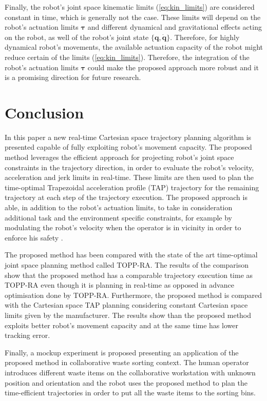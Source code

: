 Finally, the robot's joint space kinematic limits (\ref{eq:kin_limits}) are considered constant in time, which is generally not the case.
These limits will depend on the robot's actuation limits $\bm{\tau}$ and different dynamical and gravitational effects acting on the robot, as well of the robot's joint state $\{\bm{q},\dot{\bm{q}}\}$. Therefore, for highly dynamical robot's movements, the available actuation capacity of the robot might reduce certain of the limits (\ref{eq:kin_limits}). Therefore, the integration of the robot's actuation limits $\bm{\tau}$ could make the proposed approach more robust and it is a promising direction for future research. 


\section{Conclusion}


In this paper a new real-time Cartesian space trajectory planning algorithm is presented capable of fully exploiting robot's movement capacity. The proposed method leverages the efficient approach for projecting robot's joint space constraints in the trajectory direction, in order to evaluate the robot's velocity, acceleration and jerk limits in real-time. These limits are then used to plan the time-optimal Trapezoidal acceleration profile (TAP) trajectory for the remaining trajectory at each step of the trajectory execution. The proposed approach is able, in addition to the robot's actuation limits, to take in consideration additional task and the environment specific constraints, for example by modulating the robot's velocity when the operator is in vicinity in order to enforce his safety \cite{smu}.

The proposed method has been compared with the state of the art time-optimal joint space planning method called TOPP-RA. The results of the comparison show that the proposed method has a comparable trajectory execution time as TOPP-RA even though it is planning in real-time as opposed in advance optimisation done by TOPP-RA.
Furthermore, the proposed method is compared with the Cartesian space TAP planning considering constant Cartesian space limits given by the manufacturer. The results show than the proposed method exploits better robot's movement capacity and at the same time has lower tracking error. 

Finally, a mockup experiment is proposed presenting an application of the proposed method in collaborative waste sorting context. The human operator introduces different waste items on the collaborative workstation with unknown position and orientation and the robot uses the proposed method to plan the time-efficient trajectories in order to put all the waste items to the sorting bins.
